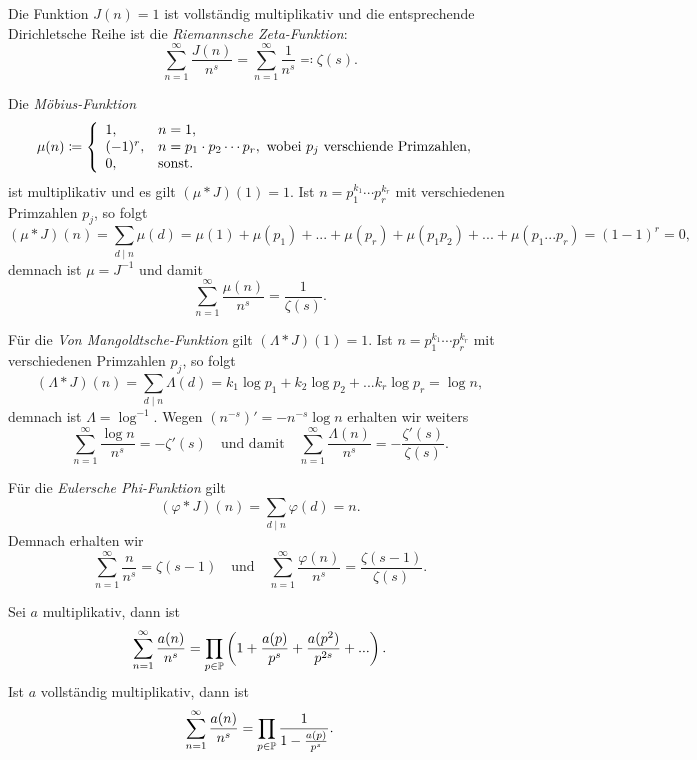 \begin{example}
    Die Funktion $J(n) = 1$ ist vollständig multiplikativ und die entsprechende Dirichletsche Reihe ist die \emph{Riemannsche Zeta-Funktion}:
    $$ \sum_{n=1}^\infty \frac{J(n)}{n^s} = \sum_{n=1}^\infty \frac{1}{n^s} \eqqcolon \zeta(s). $$
\end{example}

\begin{example}
    Die \emph{Möbius-Funktion}
    $$ \mu(n) \coloneqq \left\{ \begin{array}{ll}
        1, & n = 1, \\
        (-1)^r, & n = p_1 \cdot p_2 \cdots p_r, \textrm{ wobei $p_j$ verschiende Primzahlen}, \\
        0, & \textrm{sonst}.
    \end{array} \right. \\ $$
    ist multiplikativ und es gilt $(\mu \ast J)(1) = 1$. Ist $n = p_1^{k_1} \cdots p_r^{k_r}$ mit verschiedenen Primzahlen $p_j$, so folgt
    $$ (\mu \ast J)(n) = \sum_{d \mid n} \mu(d) = \mu(1) + \mu(p_1) + ... + \mu(p_r) + \mu(p_1 p_2) + ... + \mu(p_1 ... p_r) = (1 - 1)^r = 0, $$
    demnach ist $\mu = J^{-1}$ und damit
    $$ \sum_{n=1}^\infty \frac{\mu(n)}{n^s} = \frac{1}{\zeta(s)}. $$
\end{example}

\begin{example}
    Für die \emph{Von Mangoldtsche-Funktion} gilt $(\Lambda \ast J)(1) = 1$. Ist $n = p_1^{k_1} \cdots p_r^{k_r}$ mit verschiedenen Primzahlen $p_j$, so folgt
    $$ (\Lambda \ast J)(n) = \sum_{d \mid n} \Lambda(d) = k_1 \log p_1 + k_2 \log p_2 + ... k_r \log p_r = \log n, $$
    demnach ist $\Lambda = \log^{-1}$. Wegen $(n^{-s})' = -n^{-s} \log n$ erhalten wir weiters
    $$ \sum_{n=1}^\infty \frac{\log n}{n^s} = -\zeta'(s) \quad \textrm{und damit} \quad \sum_{n=1}^\infty \frac{\Lambda(n)}{n^s} = -\frac{\zeta'(s)}{\zeta(s)}. $$
\end{example}

\begin{example}
    Für die \emph{Eulersche Phi-Funktion} gilt
    $$ (\varphi \ast J)(n) = \sum_{d \mid n} \varphi(d) = n. $$
    Demnach erhalten wir
    $$ \sum_{n=1}^\infty \frac{n}{n^s} = \zeta(s-1) \quad \textrm{und} \quad \sum_{n=1}^\infty \frac{\varphi(n)}{n^s} = \frac{\zeta(s-1)}{\zeta(s)}. $$
\end{example}

\begin{theorem}
    Sei $a$ multiplikativ, dann ist
    $$ \sum_{n=1}^\infty \frac{a(n)}{n^s} = \prod_{p \in \P} \left( 1 + \frac{a(p)}{p^s} + \frac{a(p^2)}{p^{2s}} + ... \right). $$
    Ist $a$ vollständig multiplikativ, dann ist
    $$ \sum_{n=1}^\infty \frac{a(n)}{n^s} = \prod_{p \in \P} \frac{1}{1 - \frac{a(p)}{p^s}}. $$
\end{theorem}